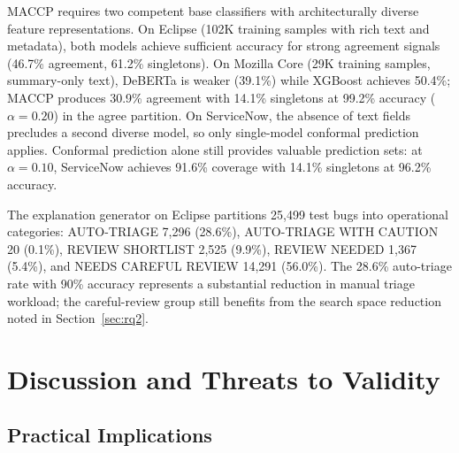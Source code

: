 \documentclass[conference]{IEEEtran}
\begin{document}
MACCP requires two competent base classifiers with architecturally diverse feature representations. On Eclipse (102K training samples with rich text and metadata), both models achieve sufficient accuracy for strong agreement signals (46.7\% agreement, 61.2\% singletons). On Mozilla Core (29K training samples, summary-only text), DeBERTa is weaker (39.1\%) while XGBoost achieves 50.4\%; MACCP produces 30.9\% agreement with 14.1\% singletons at 99.2\% accuracy ($\alpha{=}0.20$) in the agree partition. On ServiceNow, the absence of text fields precludes a second diverse model, so only single-model conformal prediction applies. Conformal prediction alone still provides valuable prediction sets: at $\alpha = 0.10$, ServiceNow achieves 91.6\% coverage with 14.1\% singletons at 96.2\% accuracy.

The explanation generator on Eclipse partitions 25,499 test bugs into operational categories: AUTO-TRIAGE 7,296 (28.6\%), AUTO-TRIAGE WITH CAUTION 20 (0.1\%), REVIEW SHORTLIST 2,525 (9.9\%), REVIEW NEEDED 1,367 (5.4\%), and NEEDS CAREFUL REVIEW 14,291 (56.0\%). The 28.6\% auto-triage rate with 90\% accuracy represents a substantial reduction in manual triage workload; the careful-review group still benefits from the search space reduction noted in Section~\ref{sec:rq2}.

\vspace{0.5em}
\noindent{}

\section{Discussion and Threats to Validity}\label{sec:discussion}

\subsection{Practical Implications}
\end{document}
